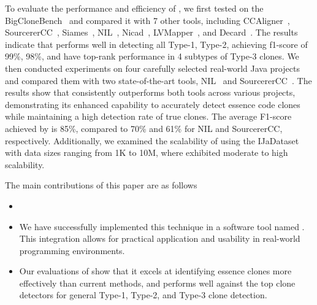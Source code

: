 To evaluate the performance and efficiency of \toolname, we first tested \toolname on the BigCloneBench~\cite{big} and compared it with 7 other tools, including CCAligner~\cite{wang2018ccaligner}, SourcererCC~\cite{sajnani2016sourcerercc}, Siames~\cite{Ragkhitwetsagul2019SiameseSA}, NIL~\cite{nil2021}, Nicad~\cite{roy2008nicad}, LVMapper~\cite{lvmapper2020}, and Decard~\cite{jiang2007deckard}. 
The results indicate that \toolname performs well in detecting all Type-1, Type-2, achieving f1-score of 99\%, 98\%, and have top-rank performance in 4 subtypes of Type-3 clones. %
We then conducted experiments on four carefully selected real-world Java projects and compared them with two state-of-the-art tools, NIL~\cite{nil2021} and SourcererCC~\cite{sajnani2016sourcerercc}. 
The results show that \toolname consistently outperforms both tools across various projects, demonstrating its enhanced capability to accurately detect essence code clones while maintaining a high detection rate of true clones. 
The average F1-score achieved by \toolname is 85\%, compared to 70\% and 61\% for NIL and SourcererCC, respectively.
Additionally, we examined the scalability of \toolname using the IJaDataset~\cite{ijadataset} with data sizes ranging from 1K to 10M, where \toolname exhibited moderate to high scalability.

The main contributions of this paper are as follows
\begin{itemize}
    \item {}
    \item We have successfully implemented this technique in a software tool named \toolname. This integration allows for practical application and usability in real-world programming environments. 
    \item Our evaluations of \toolname show that it excels at identifying essence clones more effectively than current methods, and performs well against the top clone detectors for general Type-1, Type-2, and Type-3 clone detection.
\end{itemize}

